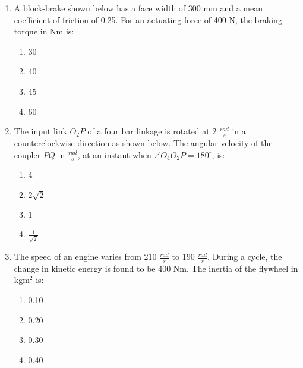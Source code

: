 \documentclass[journal,9pt,onecolumn]{IEEEtran}
\begin{document}
\begin{enumerate}
\item A block-brake shown below has a face width of 300 mm and a mean coefficient of friction of 0.25. For an actuating force of 400 N, the braking torque in Nm is:
    \begin{center}
    
     \end{center}
\begin{multicols}{4}
\begin{enumerate}
    \item 30
    \item 40
    \item 45
    \item 60
\end{enumerate}
\end{multicols}

\item  The input link $O_2P$ of a four bar linkage is rotated at 2 $\frac{rad}{s}$ in a counterclockwise direction as shown below. The angular velocity of the coupler $PQ$ in $\frac{rad}{s}$, at an instant when $\angle O_4O_2P = 180^\circ$, is:
    \begin{center}

 \end{center}
\begin{multicols}{4}
\begin{enumerate}
    \item 4
    \item $2\sqrt{2}$
    \item 1
    \item $\frac{1}{\sqrt{2}}$
    \end{enumerate}
\end{multicols}

\item  The speed of an engine varies from 210 $\frac{rad}{s}$ to 190 $\frac{rad}{s}$. During a cycle, the change in kinetic energy is found to be 400 Nm. The inertia of the flywheel in kgm$^2$ is:
\begin{multicols}{4}
\begin{enumerate}
    \item 0.10
    \item 0.20
    \item 0.30
    \item 0.40
\end{enumerate}
\end{multicols}

\end{enumerate}
\end{document}
